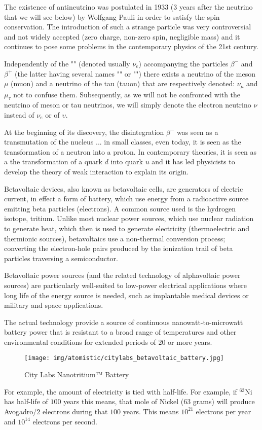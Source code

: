 	The existence of antineutrino was postulated in 1933 ($3$ years after the neutrino that we will see below) by Wolfgang Pauli in order to satisfy the spin conservation. The introduction of such a strange particle was very controversial and not widely accepted (zero charge, non-zero spin, negligible mass) and it continues to pose some problems in the contemporary physics of the 21st century.

	Independently of the "" (denoted usually $\nu_e$) accompanying the particles $\beta^{-}$ and $\beta^{+}$ (the latter having several names "" or "") there exists a neutrino of the meson $\mu$ (muon) and a neutrino of the tau (tauon) that are respectively denoted: $\nu_\mu$ and $\mu_\tau$ not to confuse them. Subsequently, as we will not be confronted with the neutrino of meson or tau neutrinos, we will simply denote the electron neutrino $\nu$ instead of $\nu_e$ or of $\upsilon$.
	\begin{tcolorbox}[title=Remark,colframe=black,arc=10pt]
	At the beginning of its discovery, the disintegration $\beta^{-}$ was seen as a transmutation of the nucleus ... in small classes, even today, it is seen as the transformation of a neutron into a proton. In contemporary theories, it is seen as a the transformation of a quark $d$ into quark $u$ and it has led physicists to develop the theory of weak interaction to explain its origin.
	\end{tcolorbox}
	Betavoltaic devices, also known as betavoltaic cells, are generators of electric current, in effect a form of battery, which use energy from a radioactive source emitting beta particles (electrons). A common source used is the hydrogen isotope, tritium. Unlike most nuclear power sources, which use nuclear radiation to generate heat, which then is used to generate electricity (thermoelectric and thermionic sources), betavoltaics use a non-thermal conversion process; converting the electron-hole pairs produced by the ionization trail of beta particles traversing a semiconductor.
	
	Betavoltaic power sources (and the related technology of alphavoltaic power sources) are particularly well-suited to low-power electrical applications where long life of the energy source is needed, such as implantable medical devices or military and space applications.
	
	The actual technology provide a source of continuous nanowatt-to-microwatt battery power that is resistant to a broad range of temperatures and other environmental conditions for extended periods of $20$ or more years.
	\begin{figure}[H]
		\centering
		\texttt{[image: img/atomistic/citylabs\_betavoltaic\_battery.jpg]}
		\caption{City Labs Nanotritium™ Battery}
	\end{figure}
	For example, the amount of electricity is tied with half-life. For example, if $^{63}\mathrm{Ni}$ has half-life of $100$ years this means, that mole of Nickel (63 grams) will produce Avogadro/$2$ electrons during that $100$ years. This means $10^{21}$ electrons per year and $10^{14}$ electrons per second.

